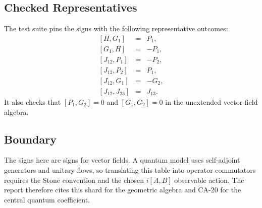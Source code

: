 \subsection{Checked Representatives}

The test suite pins the signs with the following representative outcomes:
\[
\begin{array}{rcl}
  [H,G_1]&=&P_1,\\
  {}[G_1,H]&=&-P_1,\\
  {}[J_{12},P_1]&=&-P_2,\\
  {}[J_{12},P_2]&=&P_1,\\
  {}[J_{12},G_1]&=&-G_2,\\
  {}[J_{12},J_{23}]&=&J_{13}.
\end{array}
\]
It also checks that \([P_1,G_2]=0\) and \([G_1,G_2]=0\) in the unextended
vector-field algebra.

\subsection{Boundary}

The signs here are signs for vector fields.  A quantum model uses self-adjoint
generators and unitary flows, so translating this table into operator
commutators requires the Stone convention and the chosen \(i[A,B]\) observable
action.  The report therefore cites this shard for the geometric algebra and
CA-20 for the central quantum coefficient.
